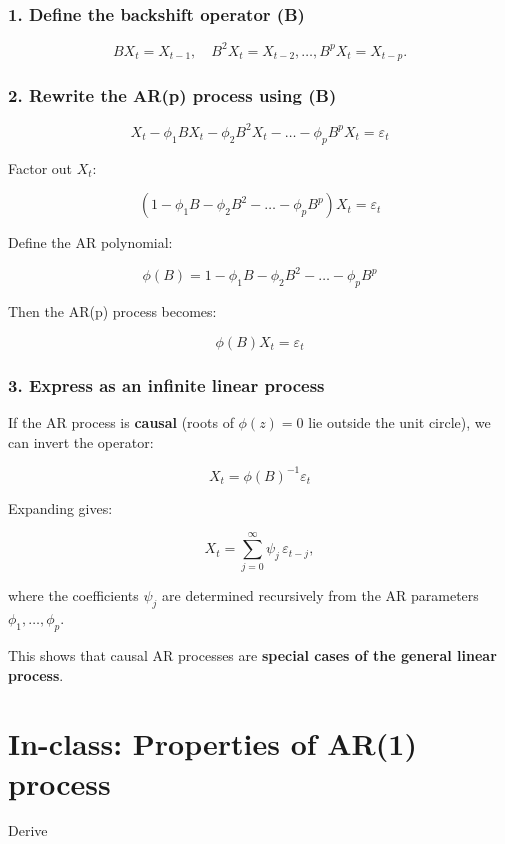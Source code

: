 \documentclass[
  11pt,
  a4paper,
]{report}
\begin{document}
\subsubsection{1. Define the backshift operator
(B)}\label{define-the-backshift-operator-b}

\[B X_t = X_{t-1}, \quad B^2 X_t = X_{t-2}, \dots, B^p X_t = X_{t-p}.\]

\subsubsection{2. Rewrite the AR(p) process using
(B)}\label{rewrite-the-arp-process-using-b}

\[X_t - \phi_1 B X_t - \phi_2 B^2 X_t - \dots - \phi_p B^p X_t = \varepsilon_t\]

Factor out \(X_t\):

\[(1 - \phi_1 B - \phi_2 B^2 - \dots - \phi_p B^p) X_t = \varepsilon_t\]

Define the AR polynomial:

\[\phi(B) = 1 - \phi_1 B - \phi_2 B^2 - \dots - \phi_p B^p\]

Then the AR(p) process becomes:

\[\phi(B) X_t = \varepsilon_t\]

\subsubsection{3. Express as an infinite linear
process}\label{express-as-an-infinite-linear-process}

If the AR process is \textbf{causal} (roots of \(\phi(z)=0\) lie outside
the unit circle), we can invert the operator:

\[X_t = \phi(B)^{-1} \varepsilon_t\]

Expanding gives:

\[X_t = \sum_{j=0}^{\infty} \psi_j \, \varepsilon_{t-j},\]

where the coefficients \(\psi_j\) are determined recursively from the AR
parameters \(\phi_1, \dots, \phi_p\).

This shows that causal AR processes are \textbf{special cases of the
general linear process}.

\section{In-class: Properties of AR(1)
process}\label{in-class-properties-of-ar1-process}

Derive
\end{document}
